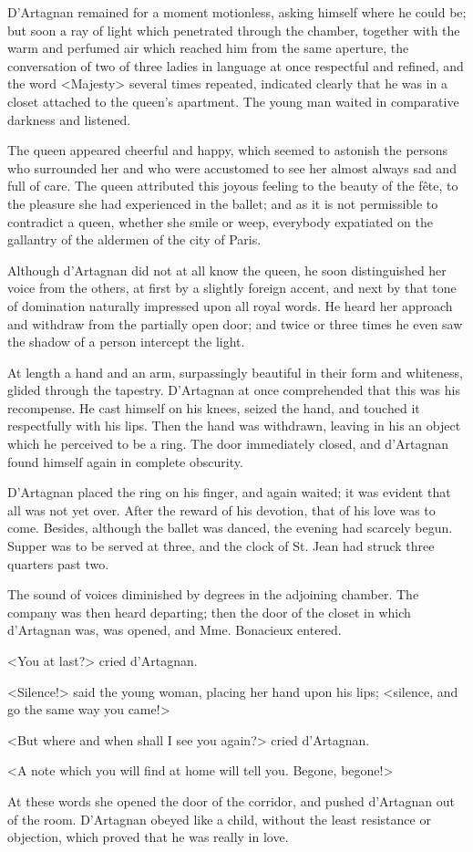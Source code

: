 D'Artagnan remained for a moment motionless, asking himself where he could be; but soon a ray of light which penetrated through the chamber, together with the warm and perfumed air which reached him from the same aperture, the conversation of two of three ladies in language at once respectful and refined, and the word <Majesty> several times repeated, indicated clearly that he was in a closet attached to the queen's apartment. The young man waited in comparative darkness and listened. 

The queen appeared cheerful and happy, which seemed to astonish the persons who surrounded her and who were accustomed to see her almost always sad and full of care. The queen attributed this joyous feeling to the beauty of the fête, to the pleasure she had experienced in the ballet; and as it is not permissible to contradict a queen, whether she smile or weep, everybody expatiated on the gallantry of the aldermen of the city of Paris. 

Although d'Artagnan did not at all know the queen, he soon distinguished her voice from the others, at first by a slightly foreign accent, and next by that tone of domination naturally impressed upon all royal words. He heard her approach and withdraw from the partially open door; and twice or three times he even saw the shadow of a person intercept the light. 

At length a hand and an arm, surpassingly beautiful in their form and whiteness, glided through the tapestry. D'Artagnan at once comprehended that this was his recompense. He cast himself on his knees, seized the hand, and touched it respectfully with his lips. Then the hand was withdrawn, leaving in his an object which he perceived to be a ring. The door immediately closed, and d'Artagnan found himself again in complete obscurity. 

D'Artagnan placed the ring on his finger, and again waited; it was evident that all was not yet over. After the reward of his devotion, that of his love was to come. Besides, although the ballet was danced, the evening had scarcely begun. Supper was to be served at three, and the clock of St. Jean had struck three quarters past two. 

The sound of voices diminished by degrees in the adjoining chamber. The company was then heard departing; then the door of the closet in which d'Artagnan was, was opened, and Mme. Bonacieux entered. 

<You at last?> cried d'Artagnan. 

<Silence!> said the young woman, placing her hand upon his lips; <silence, and go the same way you came!> 

<But where and when shall I see you again?> cried d'Artagnan. 

<A note which you will find at home will tell you. Begone, begone!> 

At these words she opened the door of the corridor, and pushed d'Artagnan out of the room. D'Artagnan obeyed like a child, without the least resistance or objection, which proved that he was really in love.